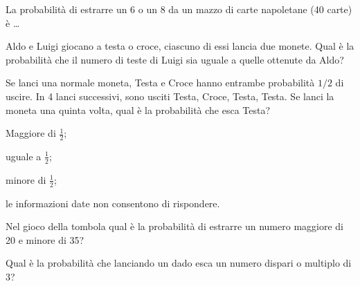 \begin{esercizio} %
La probabilità di estrarre un 6 o un 8 da un mazzo di carte napoletane (40 carte) è \ldots
\end{esercizio}

\begin{esercizio} %
Aldo e Luigi giocano a testa o croce, ciascuno di essi lancia due monete. Qual è la probabilità che il numero di teste di Luigi sia uguale a quelle ottenute da Aldo?
\end{esercizio}

\begin{esercizio} %
Se lanci una normale moneta, Testa e Croce hanno entrambe probabilità $1/2$ di uscire. In 4 lanci successivi, sono usciti Testa, Croce, Testa, Testa. Se lanci la moneta una quinta volta, qual è la probabilità che esca Testa?
\begin{itemize*}
\item Maggiore di $ \frac 1 2 $;
\item uguale a $ \frac 1 2 $;
\item minore di $ \frac 1 2 $;
\item le informazioni date non consentono di rispondere.
\end{itemize*}
\end{esercizio}

\begin{esercizio} %
Nel gioco della tombola qual è la probabilità di estrarre un numero maggiore di 20 e minore di 35?
\end{esercizio}

\begin{esercizio} %
Qual è la probabilità che lanciando un dado esca un numero dispari o multiplo di 3?
\end{esercizio}

